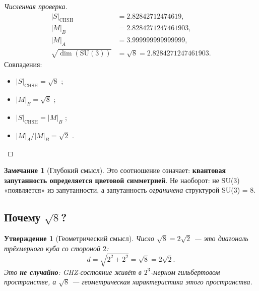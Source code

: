 \documentclass[11pt,a4paper]{article}
\newcommand{\SU}{\mathrm{SU}}
\newtheorem{proposition}[theorem]{Утверждение}
\theoremstyle{definition}
\newtheorem{remark}[theorem]{Замечание}
\begin{document}
\begin{proof}[Численная проверка]
\begin{align}
    |S|_{\text{CHSH}} &= 2.82842712474619, \\
    |M|_B &= 2.8284271247461903, \\
    |M|_A &= 3.999999999999999, \\
    \sqrt{\dim(\SU(3))} &= \sqrt{8} = 2.8284271247461903.
\end{align}
Совпадения:
\begin{itemize}
    \item $|S|_{\text{CHSH}} = \sqrt{8}$ \checkmark;
    \item $|M|_B = \sqrt{8}$ \checkmark;
    \item $|S|_{\text{CHSH}} = |M|_B$ \checkmark;
    \item $|M|_A / |M|_B = \sqrt{2}$ \checkmark.
\end{itemize}
\end{proof}

\begin{remark}[Глубокий смысл]
\label{rem:entanglement-deep}
Это соотношение означает: \textbf{квантовая запутанность 
определяется цветовой симметрией}. Не наоборот: не SU(3) 
«появляется» из запутанности, а запутанность \emph{ограничена} 
структурой SU(3) = 8.
\end{remark}

\subsection{Почему $\sqrt{8}$?}
\label{subsec:why-sqrt-8}

\begin{proposition}[Геометрический смысл]
\label{prop:sqrt-8-geometric}
Число $\sqrt{8} = 2\sqrt{2}$ — это \emph{диагональ} 
трёхмерного куба со стороной $2$:
\begin{equation}
    d = \sqrt{2^2 + 2^2} = \sqrt{8} = 2\sqrt{2}.
\end{equation}
Это \textbf{не случайно}: GHZ-состояние живёт в 
$2^3$-мерном гильбертовом пространстве, а $\sqrt{8}$ — 
\emph{геометрическая} характеристика этого пространства.
\end{proposition}
\end{document}
